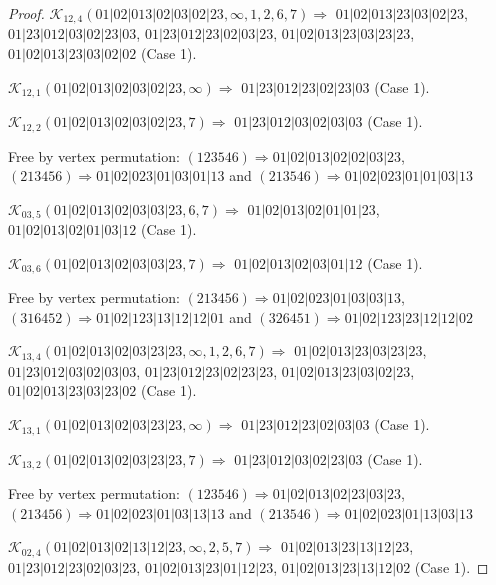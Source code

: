 \documentclass[12pt]{article}
\theoremstyle{plain}
\theoremstyle{definition}
\theoremstyle{remark}
\newcommand{\fancy}[1]{\mathcal{#1}}
\def\K{\fancy{K}}
\begin{document}
\begin{proof}
	
	
	\bigskip
	
	$\K_{12,4}(01|02|013|02|03|02|23,\infty,1, 2, 6, 7)\Rightarrow $ $01|02|013|23|03|02|23$, $01|23|012|03|02|23|03$, $01|23|012|23|02|03|23$, $01|02|013|23|03|23|23$, $01|02|013|23|03|02|02$ (Case 1).
	
	$\K_{12,1}(01|02|013|02|03|02|23,\infty)\Rightarrow $ $01|23|012|23|02|23|03$ (Case 1).
	
	$\K_{12,2}(01|02|013|02|03|02|23,7)\Rightarrow $ $01|23|012|03|02|03|03$ (Case 1).
	
	
	
	Free by vertex permutation: $(1 2 3 5 4 6)\Rightarrow 01|02|013|02|02|03|23$, $(2 1 3 4 5 6)\Rightarrow 01|02|023|01|03|01|13$ and $(2 1 3 5 4 6)\Rightarrow 01|02|023|01|01|03|13$
	
	
	
	\bigskip
	
	$\K_{03,5}(01|02|013|02|03|03|23,6, 7)\Rightarrow $ $01|02|013|02|01|01|23$, $01|02|013|02|01|03|12$ (Case 1).
	
	$\K_{03,6}(01|02|013|02|03|03|23,7)\Rightarrow $ $01|02|013|02|03|01|12$ (Case 1).
	
	
	
	Free by vertex permutation: $(2 1 3 4 5 6)\Rightarrow 01|02|023|01|03|03|13$, $(3 1 6 4 5 2)\Rightarrow 01|02|123|13|12|12|01$ and $(3 2 6 4 5 1)\Rightarrow 01|02|123|23|12|12|02$
	
	
	
	\bigskip
	
	$\K_{13,4}(01|02|013|02|03|23|23,\infty,1, 2, 6, 7)\Rightarrow $ $01|02|013|23|03|23|23$, $01|23|012|03|02|03|03$, $01|23|012|23|02|23|23$, $01|02|013|23|03|02|23$, $01|02|013|23|03|23|02$ (Case 1).
	
	$\K_{13,1}(01|02|013|02|03|23|23,\infty)\Rightarrow $ $01|23|012|23|02|03|03$ (Case 1).
	
	$\K_{13,2}(01|02|013|02|03|23|23,7)\Rightarrow $ $01|23|012|03|02|23|03$ (Case 1).
	
	
	
	Free by vertex permutation: $(1 2 3 5 4 6)\Rightarrow 01|02|013|02|23|03|23$, $(2 1 3 4 5 6)\Rightarrow 01|02|023|01|03|13|13$ and $(2 1 3 5 4 6)\Rightarrow 01|02|023|01|13|03|13$
	
	
	
	\bigskip
	
	$\K_{02,4}(01|02|013|02|13|12|23,\infty,2, 5, 7)\Rightarrow $ $01|02|013|23|13|12|23$, $01|23|012|23|02|03|23$, $01|02|013|23|01|12|23$, $01|02|013|23|13|12|02$ (Case 1).
	

\end{proof}
\end{document}
